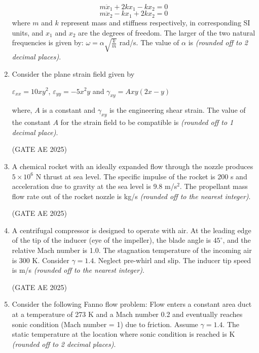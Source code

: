 \documentclass[journal,12pt,onecolumn]{IEEEtran}
\theoremstyle{remark}
\begin{document}
\begin{flushleft}
\begin{enumerate}
\[
m\ddot{x}_1 + 2kx_1 - kx_2 = 0
\]
\[
m\ddot{x}_2 - kx_1 + 2kx_2 = 0
\]
where $m$ and $k$ represent mass and stiffness respectively, in corresponding SI units, and $x_1$ and $x_2$ are the degrees of freedom. The larger of the two natural frequencies is given by: $\omega = \alpha \sqrt{\frac{k}{m}}$ rad/s. The value of $\alpha$ is \underline{\hspace{3cm}} \textit{(rounded off to 2 decimal places)}.

\item Consider the plane strain field given by  

\begin{center}
    $\varepsilon_{xx} = 10xy^2$, \quad $\varepsilon_{yy} = -5x^2y$ \quad and \quad $\gamma_{xy} = Axy(2x-y)$ 
\end{center}

where, $A$ is a constant and $\gamma_{xy}$ is the engineering shear strain. The value of the constant $A$ for the strain field to be compatible is \underline{\hspace{3cm}} \textit{(rounded off to 1 decimal place)}.

\hfill (GATE AE 2025)

\item A chemical rocket with an ideally expanded flow through the nozzle produces $5\times 10^6$ N thrust at sea level. The specific impulse of the rocket is 200 s and acceleration due to gravity at the sea level is 9.8 m/s$^2$. The propellant mass flow rate out of the rocket nozzle is \underline{\hspace{3cm}} kg/s \textit{(rounded off to the nearest integer)}.

\hfill (GATE AE 2025)

\item A centrifugal compressor is designed to operate with air. At the leading edge of the tip of the inducer (eye of the impeller), the blade angle is $45^\circ$, and the relative Mach number is 1.0. The stagnation temperature of the incoming air is 300 K. Consider $\gamma = 1.4$. Neglect pre-whirl and slip. The inducer tip speed is \underline{\hspace{3cm}} m/s \textit{(rounded off to the nearest integer)}.

\hfill (GATE AE 2025)

\item Consider the following Fanno flow problem: Flow enters a constant area duct at a temperature of 273 K and a Mach number 0.2 and eventually reaches sonic condition (Mach number = 1) due to friction. Assume $\gamma = 1.4$. The static temperature at the location where sonic condition is reached is \underline{\hspace{3cm}} K \textit{(rounded off to 2 decimal places)}.


\end{enumerate}
\end{flushleft}
\end{document}
